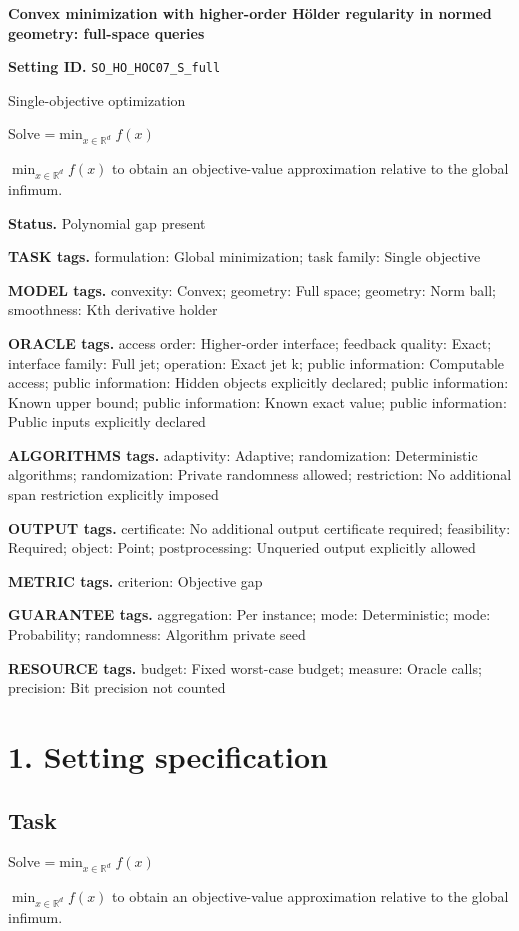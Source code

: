 \documentclass[10pt,a4paper]{article}
\newcommand{\AtlasMath}[1]{\par\begingroup\centering\setbox0=\hbox{$\displaystyle #1$}\ifdim\wd0>1.4\linewidth\typeout{ATLAS WIDE FORMULA: \the\wd0}\fi\ifdim\wd0>\linewidth\resizebox{\linewidth}{!}{\box0}\else\box0\fi\par\endgroup}
\newcommand{\AtlasInlineMath}[1]{\begingroup\setbox0=\hbox{$#1$}\ifdim\wd0>.4\linewidth\endgroup\AtlasMath{#1}\else\endgroup$#1$\fi}
\begin{document}
\raggedright

{\LARGE\bfseries\sffamily\color{AtlasNavy} Convex minimization with higher-order Hölder regularity in normed geometry: full-space queries\par}\vspace{5pt}
\textbf{Setting ID.} \texttt{SO\_\allowbreak{}\allowbreak{}HO\_\allowbreak{}\allowbreak{}HOC07\_\allowbreak{}\allowbreak{}S\_\allowbreak{}\allowbreak{}full}

Single-objective optimization

Solve \AtlasInlineMath{\min_{x\in \mathbb{R}^d}f(x)} to obtain an objective-value approximation relative to the global infimum.

\textbf{Status.} Polynomial gap present

\textbf{TASK tags.} formulation: Global minimization; task family: Single objective

\textbf{MODEL tags.} convexity: Convex; geometry: Full space; geometry: Norm ball; smoothness: Kth derivative holder

\textbf{ORACLE tags.} access order: Higher-order interface; feedback quality: Exact; interface family: Full jet; operation: Exact jet k; public information: Computable access; public information: Hidden objects explicitly declared; public information: Known upper bound; public information: Known exact value; public information: Public inputs explicitly declared

\textbf{ALGORITHMS tags.} adaptivity: Adaptive; randomization: Deterministic algorithms; randomization: Private randomness allowed; restriction: No additional span restriction explicitly imposed

\textbf{OUTPUT tags.} certificate: No additional output certificate required; feasibility: Required; object: Point; postprocessing: Unqueried output explicitly allowed

\textbf{METRIC tags.} criterion: Objective gap

\textbf{GUARANTEE tags.} aggregation: Per instance; mode: Deterministic; mode: Probability; randomness: Algorithm private seed

\textbf{RESOURCE tags.} budget: Fixed worst-case budget; measure: Oracle calls; precision: Bit precision not counted

\section{1. Setting specification}
\subsection{Task}
Solve \AtlasInlineMath{\min_{x\in \mathbb{R}^d}f(x)} to obtain an objective-value approximation relative to the global infimum.
\end{document}
